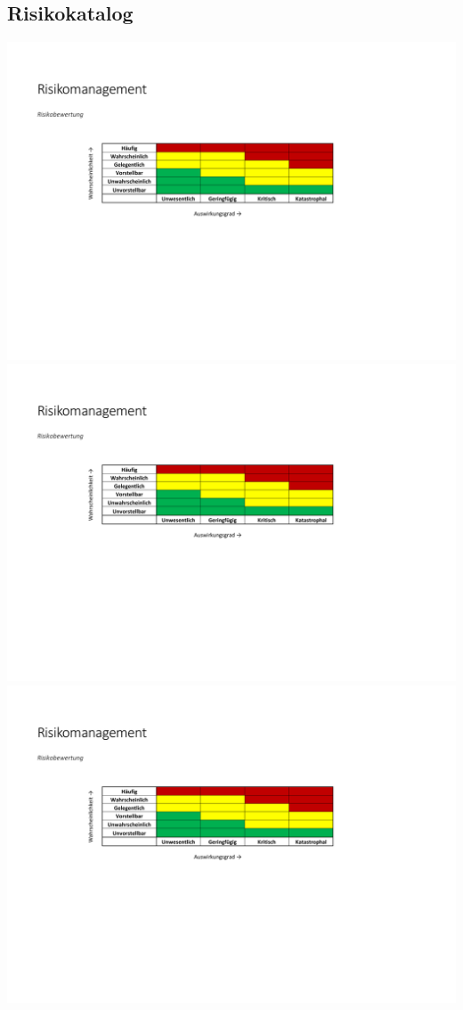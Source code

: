      
     \begin{landscape}
     	\section{Risikokatalog}
			\includegraphics[page=1,scale=0.73,clip,trim=17mm 27mm 31mm 39mm]{Anhangsdokument/Risikomanagement.pdf}
			\newpage  			
			\includegraphics[page=2,scale=0.90,clip,trim=17mm 22mm 21mm 32mm]{Anhangsdokument/Risikomanagement.pdf}
			\newpage  			
			\includegraphics[page=3,scale=0.90,clip,trim=17mm 22mm 21mm 22mm]{Anhangsdokument/Risikomanagement.pdf}

\end{landscape}
